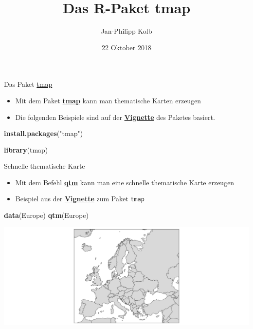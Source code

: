 \documentclass[ignorenonframetext,]{beamer}
\title{Das R-Paket tmap}
\author{Jan-Philipp Kolb}
\date{22 Oktober 2018}
\newenvironment{Shaded}{\begin{snugshade}}{\end{snugshade}}
\newcommand{\KeywordTok}[1]{\textcolor[rgb]{0.13,0.29,0.53}{\textbf{#1}}}
\newcommand{\StringTok}[1]{\textcolor[rgb]{0.31,0.60,0.02}{#1}}
\newcommand{\NormalTok}[1]{#1}
\providecommand{\tightlist}{%
  \setlength{\itemsep}{0pt}\setlength{\parskip}{0pt}}
\begin{document}
\frame{\titlepage}

\begin{frame}[fragile]{Das Paket
\href{https://cran.r-project.org/web/packages/tmap/index.html}{tmap}}

\begin{itemize}
\tightlist
\item
  Mit dem Paket
  \href{http://twitter.com/sharon000/status/593028906820599808/photo/1?ref_src=twsrc\%5Etfw}{\textbf{tmap}}
  kann man thematische Karten erzeugen
\item
  Die folgenden Beispiele sind auf der
  \href{https://cran.r-project.org/web/packages/tmap/vignettes/tmap-nutshell.html}{\textbf{Vignette}}
  des Paketes basiert.
\end{itemize}

\begin{Shaded}
\begin{Highlighting}[]
\KeywordTok{install.packages}\NormalTok{(}\StringTok{"tmap"}\NormalTok{)}
\end{Highlighting}
\end{Shaded}

\begin{Shaded}
\begin{Highlighting}[]
\KeywordTok{library}\NormalTok{(tmap)}
\end{Highlighting}
\end{Shaded}

\end{frame}

\begin{frame}[fragile]{Schnelle thematische Karte}

\begin{itemize}
\item
  Mit dem Befehl
  \href{https://cran.r-project.org/web/packages/tmap/vignettes/tmap-nutshell.html}{\textbf{qtm}}
  kann man eine schnelle thematische Karte erzeugen
\item
  Beispiel aus der
  \href{https://cran.r-project.org/web/packages/tmap/vignettes/tmap-nutshell.html}{\textbf{Vignette}}
  zum Paket \texttt{tmap}
\end{itemize}

\begin{Shaded}
\begin{Highlighting}[]
\KeywordTok{data}\NormalTok{(Europe)}
\KeywordTok{qtm}\NormalTok{(Europe)}
\end{Highlighting}
\end{Shaded}

\includegraphics{tmap_files/figure-beamer/unnamed-chunk-4-1.pdf}

\end{frame}
\end{document}
